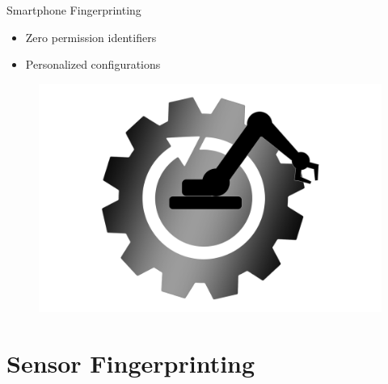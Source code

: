 \documentclass[aspectratio=169]{beamer}
[aspectratio=169] %
\begin{document}
\begin{frame}{Smartphone Fingerprinting}
  \begin{minipage}{0.49\textwidth} 
    \begin{itemize}
      \item Zero permission identifiers
      \item Personalized configurations
    \end{itemize}
  \end{minipage}
  \hfill
  \begin{minipage}{0.49\textwidth} 
    \begin{figure}
      \centering
      \includegraphics[height=0.5\textheight]{figures/machine.png}
    \end{figure}
  \end{minipage}
\end{frame}


\section{Sensor Fingerprinting}
\end{document}
